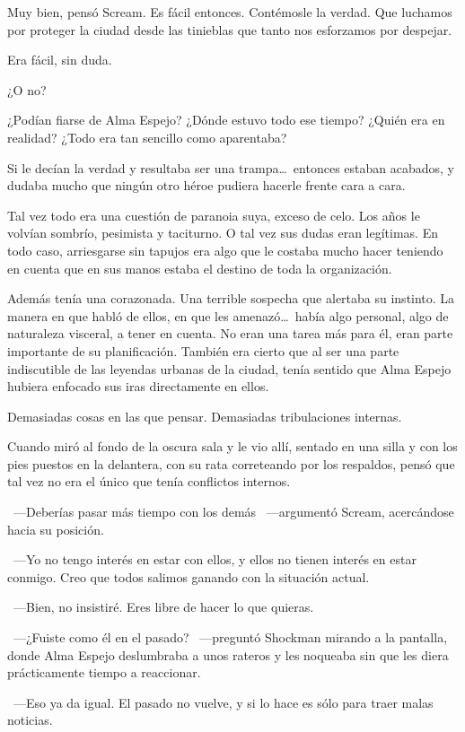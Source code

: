 Muy bien, pensó Scream. Es fácil entonces. Contémosle la verdad. Que luchamos por proteger la ciudad desde las tinieblas que tanto nos esforzamos por despejar.

Era fácil, sin duda.

¿O no?

¿Podían fiarse de Alma Espejo? ¿Dónde estuvo todo ese tiempo? ¿Quién era en realidad? ¿Todo era tan sencillo como aparentaba?

Si le decían la verdad y resultaba ser una trampa\dots\ entonces estaban acabados, y dudaba mucho que ningún otro héroe pudiera hacerle frente cara a cara.

Tal vez todo era una cuestión de paranoia suya, exceso de celo. Los años le volvían sombrío, pesimista y taciturno. O tal vez sus dudas eran legítimas. En todo caso, arriesgarse sin tapujos era algo que le costaba mucho hacer teniendo en cuenta que en sus manos estaba el destino de toda la organización.

Además tenía una corazonada. Una terrible sospecha que alertaba su instinto. La manera en que habló de ellos, en que les amenazó\dots\ había algo personal, algo de naturaleza visceral, a tener en cuenta. No eran una tarea más para él, eran parte importante de su planificación. También era cierto que al ser una parte indiscutible de las leyendas urbanas de la ciudad, tenía sentido que Alma Espejo hubiera enfocado sus iras directamente en ellos.

Demasiadas cosas en las que pensar. Demasiadas tribulaciones internas.

Cuando miró al fondo de la oscura sala y le vio allí, sentado en una silla y con los pies puestos en la delantera, con su rata correteando por los respaldos, pensó que tal vez no era el único que tenía conflictos internos.

~---Deberías pasar más tiempo con los demás ~---argumentó Scream, acercándose hacia su posición.

~---Yo no tengo interés en estar con ellos, y ellos no tienen interés en estar conmigo. Creo que todos salimos ganando con la situación actual.

~---Bien, no insistiré. Eres libre de hacer lo que quieras.

~---¿Fuiste como él en el pasado? ~---preguntó Shockman mirando a la pantalla, donde Alma Espejo deslumbraba a unos rateros y les noqueaba sin que les diera prácticamente tiempo a reaccionar.

~---Eso ya da igual. El pasado no vuelve, y si lo hace es sólo para traer malas noticias.

